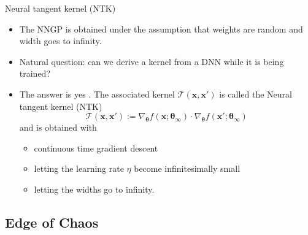 \documentclass[9pt]{beamer}
\begin{document}
\begin{frame}{Neural tangent kernel (NTK)}
\begin{itemize}
	\item The NNGP is obtained under the assumption that weights are random and width goes to infinity.
	\item Natural question: can we derive a kernel from a DNN while it is being trained?
	\item The answer is yes \citep{jacot2018neural}. The associated kernel $\mathcal{T}(\boldsymbol{x},\boldsymbol{x}')$ is called the \alert{Neural tangent kernel} (NTK)
	$$\mathcal{T}(\boldsymbol{x},\boldsymbol{x}') := \nabla_{\boldsymbol{\theta}}f(\boldsymbol{x}; \boldsymbol{\theta_\infty})\cdot \nabla_{\boldsymbol{\theta}}f(\boldsymbol{x}'; \boldsymbol{\theta_\infty})$$
	and is obtained with 
	\begin{itemize}
		\item continuous time gradient descent
		\item letting the learning rate $\eta$ become infinitesimally small
		\item letting the widths go to infinity.
	\end{itemize}
\end{itemize}
\end{frame}



\subsection{Edge of Chaos}
\end{document}
